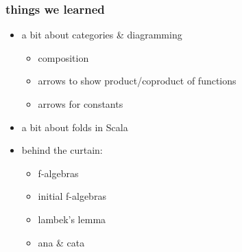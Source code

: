 \documentclass[include/preamble.tex]{subfiles}
\begin{document}
\begin{frame}
  \frametitle{things we learned}
  \begin{itemize}
  \item a bit about categories \& diagramming
    \begin{itemize}
    \item composition
    \item arrows to show product/coproduct of functions
    \item arrows for constants
    \end{itemize}
    \vspace{1em}
  \item a bit about folds in Scala
    \pause
    \vspace{1em}
  \item behind the curtain:
    \begin{itemize}
    \item f-algebras
    \item initial f-algebras
    \item lambek's lemma
    \item ana \& cata
    \end{itemize}
  \end{itemize}
\end{frame}
\end{document}
